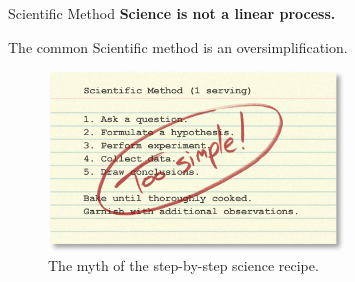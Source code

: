 \begin{frame}{Scientific Method}
	\textbf{Science is not a linear process.}

	The common Scientific method is an
	oversimplification.

	\begin{figure}
		\centering
		\includegraphics[width=0.7\textwidth]{Figures/sciencerecipe.jpg}
		\caption{The myth of the step-by-step science recipe. \cite{Science}}
	\end{figure}

\end{frame}

